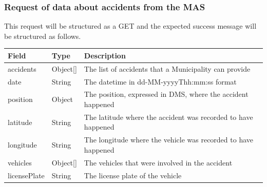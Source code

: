 				\subsubsection{Request of data about accidents from the MAS}
				This request will be structured as a GET and the expected success message will be structured as follows.
					\begin{table}[!h]
						\begin{tabular}{L{0.25\textwidth}L{0.1\textwidth}L{0.45\textwidth}}
							\toprule
							Field & Type & Description \\
							\midrule
									accidents & Object[] & The list of accidents that a Municipality can provide \\
									\hspace{2.5mm}date & String & The datetime in \newline dd-MM-yyyyThh:mm:ss format \\
									\hspace{2.5mm}position & Object & The position, expressed in DMS, where the accident happened \\
									\hspace{5mm}latitude & String & The latitude where the accident was recorded to have happened \\
									\hspace{5mm}longitude & String & The longitude where the vehicle was recorded to have happened \\
									\hspace{2.5mm}vehicles & Object[] & The vehicles that were involved in the accident \\
									\hspace{5mm}licensePlate & String & The license plate of the vehicle \\
								 	\bottomrule
								\end{tabular}
							\end{table}
